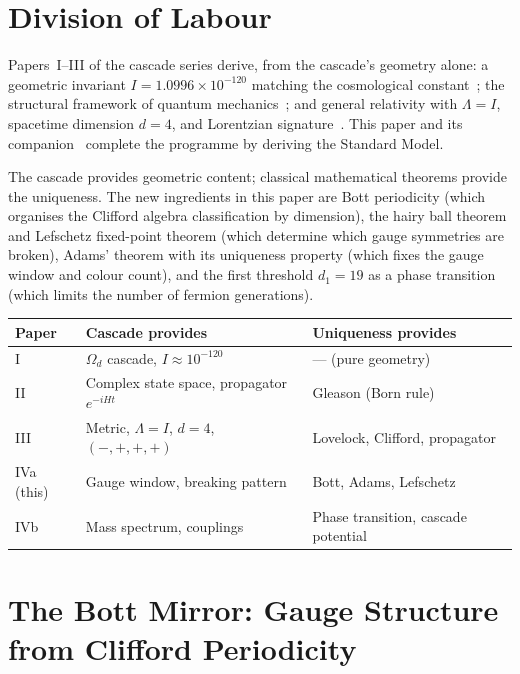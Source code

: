 \documentclass[12pt,a4paper]{article}
\begin{document}
\tableofcontents
\newpage

\section{Division of Labour}

Papers~I--III of the cascade series derive, from the cascade's geometry alone: a geometric
invariant $I=1.0996\times 10^{-120}$ matching the cosmological constant~\cite{paperI}; the
structural framework of quantum mechanics~\cite{paperII}; and general relativity with
$\Lambda=I$, spacetime dimension $d=4$, and Lorentzian signature~\cite{paperIII}. This
paper and its companion~\cite{paperIVb} complete the programme by deriving the Standard
Model.

The cascade provides geometric content; classical mathematical theorems provide the
uniqueness. The new ingredients in this paper are Bott periodicity (which organises the
Clifford algebra classification by dimension), the hairy ball theorem and Lefschetz
fixed-point theorem (which determine which gauge symmetries are broken), Adams' theorem
with its uniqueness property (which fixes the gauge window and colour count), and the
first threshold $d_1=19$ as a phase transition (which limits the number of fermion
generations).

\begin{center}
\begin{tabular}{lll}
\toprule
Paper & Cascade provides & Uniqueness provides \\
\midrule
I~\cite{paperI}    & $\Omega_d$ cascade, $I\approx 10^{-120}$ & --- (pure geometry) \\
II~\cite{paperII}  & Complex state space, propagator $e^{-iHt}$ & Gleason (Born rule) \\
III~\cite{paperIII}& Metric, $\Lambda=I$, $d=4$, $(-,+,+,+)$ & Lovelock, Clifford, propagator \\
IVa (this)         & Gauge window, breaking pattern & Bott, Adams, Lefschetz \\
IVb~\cite{paperIVb}& Mass spectrum, couplings & Phase transition, cascade potential \\
\bottomrule
\end{tabular}
\end{center}

\section{The Bott Mirror: Gauge Structure from Clifford Periodicity}
\end{document}

